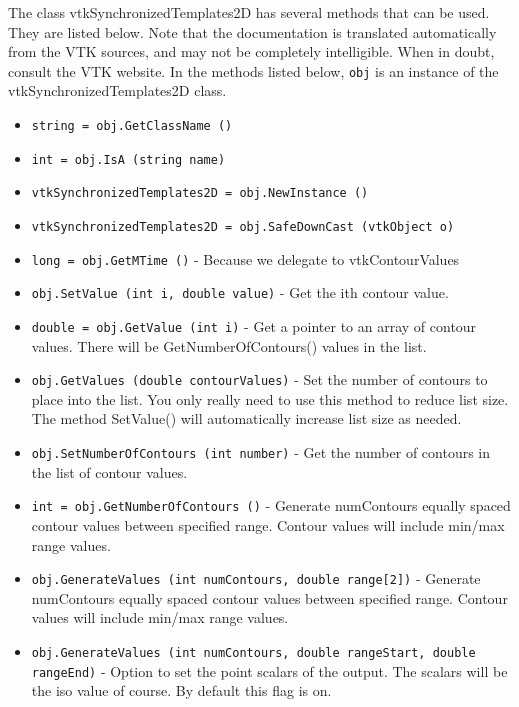 The class vtkSynchronizedTemplates2D has several methods that can be used.
  They are listed below.
Note that the documentation is translated automatically from the VTK sources,
and may not be completely intelligible.  When in doubt, consult the VTK website.
In the methods listed below, \verb|obj| is an instance of the vtkSynchronizedTemplates2D class.
\begin{itemize}
\item  \verb|string = obj.GetClassName ()|

\item  \verb|int = obj.IsA (string name)|

\item  \verb|vtkSynchronizedTemplates2D = obj.NewInstance ()|

\item  \verb|vtkSynchronizedTemplates2D = obj.SafeDownCast (vtkObject o)|

\item  \verb|long = obj.GetMTime ()| -  Because we delegate to vtkContourValues

\item  \verb|obj.SetValue (int i, double value)| -  Get the ith contour value.

\item  \verb|double = obj.GetValue (int i)| -  Get a pointer to an array of contour values. There will be
 GetNumberOfContours() values in the list.

\item  \verb|obj.GetValues (double contourValues)| -  Set the number of contours to place into the list. You only really
 need to use this method to reduce list size. The method SetValue()
 will automatically increase list size as needed.

\item  \verb|obj.SetNumberOfContours (int number)| -  Get the number of contours in the list of contour values.

\item  \verb|int = obj.GetNumberOfContours ()| -  Generate numContours equally spaced contour values between specified
 range. Contour values will include min/max range values.

\item  \verb|obj.GenerateValues (int numContours, double range[2])| -  Generate numContours equally spaced contour values between specified
 range. Contour values will include min/max range values.

\item  \verb|obj.GenerateValues (int numContours, double rangeStart, double rangeEnd)| -  Option to set the point scalars of the output.  The scalars will be the 
 iso value of course.  By default this flag is on.


\end{itemize}
